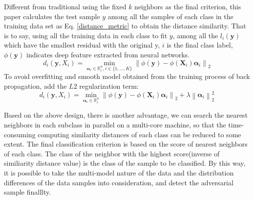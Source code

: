 \documentclass{ieeeaccess}
\begin{document}
Different from traditional using the fixed $k$ neighbors as the final criterion, this paper calculates the test sample $y$ among all the samples of each class in the training data set as Eq. \ref{distance_metric} to obtain the distance similarity. That is to say, using all the training data in each class to fit $y$, among all the $l_{i}(\boldsymbol{y})$ which have the smallest residual with the original y, $i$ is the final class label, $\phi(\boldsymbol{y})$ indicates deep feature extracted from neural networks.	
\begin{equation}
d_{i}(\boldsymbol{y},X_i)=\min _{\boldsymbol{\alpha}_{i} \in \mathbb{R}^{n}_{i}, i \in\{1, \ldots, K\}}\left\|\phi(\boldsymbol{y})-\phi(\boldsymbol{X}_{i}) \boldsymbol{\alpha}_{i}\right\|_{2}
\label{distance_metric}
\end{equation}
To avoid overfitting and smooth model obtained from the training process of back propagation, add the $L2$ regularization term:	
\begin{equation}	
d_{i}(\boldsymbol{y},X_i)=\min _{\boldsymbol{\alpha}_{i} \in \mathbb{R}^{n}_{i}}\left\|\phi(\boldsymbol{y})-\phi(\boldsymbol{X}_{i}) \boldsymbol{\alpha}_{i}\right\|_{2}+\lambda\left\|\boldsymbol{\alpha}_{i}\right\|_{2}^{2}
\label{distance_metric_withoutoverfit}
\end{equation}

	

Based on the above design, there is another advantage, we can search the nearest neighbors in each subclass in parallel on a multi-core machine, so that the  time-consuming computing similarity distances of each class can be reduced to some extent. The final classification criterion is based on the score of nearest neighbors of each class. The class of the neighbor with the highest score(inverse of similiarity distance value) is the class of the sample to be classified. By this way, it is possible to take the multi-model nature of the data and the distribution differences of the data samples into consideration, and detect the adversarial sample finalllty.
\end{document}
